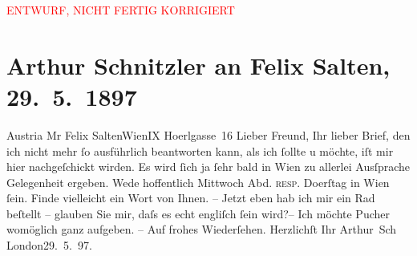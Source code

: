 
\begin{center}
            \textcolor{red}{ENTWURF, NICHT FERTIG KORRIGIERT}
                      \end{center}
            
         
         \renewcommand{\erwaehntePersonen}{Personen: Felix Salten}
         \renewcommand{\erwaehnteOrte}{Orte: Café Pucher, Forest Hill, Hörlgasse, IX., Alsergrund, London, Wien}
         \renewcommand{\erwaehnteWerke}{}
               \section[Arthur Schnitzler an Felix Salten, 29. 5. 1897]{ Arthur Schnitzler an Felix Salten, 29. 5. 1897}\nopagebreak{}\rehead{ }\begin{ledgroupsized}[t]{13cm}\normalsize\beginnumbering \toendnotes[C]{\smallbreak\pagebreak[2]} 
\pstart{}{\pb}Austria \pend{}\pstart{}Mr Felix Salten\pend{}\pstart{}Wien\pend{}\pstart{}IX Hoerlgasse 16\pend{}{\bigskip}\pstart
           \noindent{}{\pb}Lieber Freund, Ihr lieber Brief, den ich nicht mehr ſo ausführlich
               beantworten kann, als ich ſollte u möchte, iſt mir hier nachgeſchickt wirden. Es wird
               ſich ja ſehr bald in Wien zu allerlei Ausſprache
               Gelegenheit \introOben{}er\introOben{}geben. Wede hoffentlich Mittwoch Abd. \textsc{resp.} Do{\geminationn}erſtag in Wien ſein. Finde vielleicht ein Wort von Ihnen. –
               Jetzt eben hab ich mir ein Rad beſtellt – glauben Sie mir, daſs es echt engliſch ſein
               wird?– Ich möchte Pucher womöglich ganz aufgeben.
               – Auf frohes Wiederſehen. Herzlichſt Ihr \pend
           \pstart \spacefill\mbox{Arthur Sch}\pend{}\pstart
           \raggedleft{}London29. 5. 97.\pend
           
         
         \endnumbering{}\end{ledgroupsized}\begin{anhang}\end{anhang}\newcommand{\dateiname}{L02964}\newcommand{\titel}{Arthur Schnitzler an Felix Salten, 29. 5. 1897}\newcommand{\editorInnen}{Martin Anton Müller und Laura Untner}
      